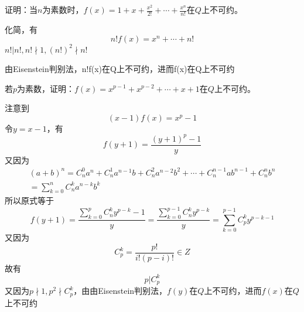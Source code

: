 \documentclass[lang=cn,10pt]{elegantbook}
\begin{document}
\begin{example}
	证明：当$n$为素数时，$f(x)=1+x+\frac{x^2}{2!}+\cdots+\frac{x^n}{n!}$在$Q$上不可约。
\end{example}
\begin{solution}
	
	化简，有
	\begin{equation*}
		n!f(x)=x^{n}+\cdots+n!
	\end{equation*}
	$n!|n!,n!\nmid1,(n!)^{2}\nmid n!$
	
	由Eisenstein判别法，n!f(x)在Q上不可约，进而f(x)在Q上不可约
\end{solution}
\begin{example}
	若$p$为素数，证明：$f(x)=x^{p-1}+x^{p-2}+\cdots+x+1$在$Q$上不可约。
\end{example}
\begin{solution}
	
	注意到
	\begin{equation*}
		(x-1)f(x)=x^{p}-1
	\end{equation*}
	令$y=x-1$，有
	\begin{equation*}
		f(y+1)=\frac{(y+1)^{p}-1}{y}
	\end{equation*}
	又因为
	\begin{equation*}
		\begin{split}
			\left( a+b \right) ^n=C_{n}^{0}a^n+C_{n}^{1}a^{n-1}b+C_{n}^{2}a^{n-2}b^2+\cdots +C_{n}^{n-1}ab^{n-1}+C_{n}^{n}b^n
			\\
			=\sum_{k=0}^n{C_{n}^{k}a^{n-k}b^k}
		\end{split}
	\end{equation*}
	所以原式等于
	\begin{equation*}
		f(y+1)=\frac{\sum_{k=0}^p{C_{n}^{k}y^{p-k}}-1}{y}=\frac{\sum_{k=0}^{p-1}{C_{n}^{k}y^{p-k}}}{y}=\sum_{k=0}^{p-1}{C_{p}^{k}y^{p-k-1}}
	\end{equation*}
	又因为
	\begin{equation*}
		C_{p}^{k}=\frac{p!}{i!(p-i)!}\in Z
	\end{equation*}
	故有
	\begin{equation*}
		p|C_{p}^{k}
	\end{equation*}
	又因为$p\nmid1,p^{2}\nmid C_{p}^{k}$，由由Eisenstein判别法，$f(y)$在$Q$上不可约，进而$f(x)$在$Q$上不可约
\end{solution}

~\\
\end{document}
